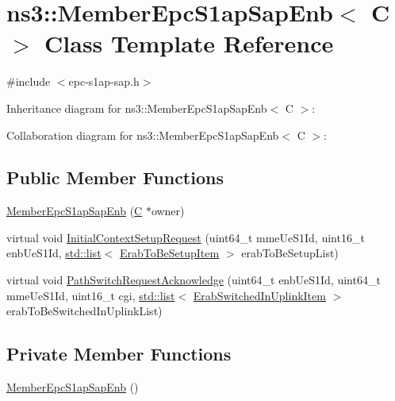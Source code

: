 \hypertarget{classns3_1_1MemberEpcS1apSapEnb}{}\section{ns3\+:\+:Member\+Epc\+S1ap\+Sap\+Enb$<$ C $>$ Class Template Reference}
\label{classns3_1_1MemberEpcS1apSapEnb}


{\ttfamily \#include $<$epc-\/s1ap-\/sap.\+h$>$}



Inheritance diagram for ns3\+:\+:Member\+Epc\+S1ap\+Sap\+Enb$<$ C $>$\+:


Collaboration diagram for ns3\+:\+:Member\+Epc\+S1ap\+Sap\+Enb$<$ C $>$\+:
\subsection*{Public Member Functions}
\begin{DoxyCompactItemize}
\item 
\hyperlink{classns3_1_1MemberEpcS1apSapEnb_a7f5569d5292005d77c8face5c3845870}{Member\+Epc\+S1ap\+Sap\+Enb} (\hyperlink{loss__COST231__small__cities__urban_8m_aaa53ca0b650dfd85c4f59fa156f7a2cc}{C} $\ast$owner)
\item 
virtual void \hyperlink{classns3_1_1MemberEpcS1apSapEnb_ab39eeb645ba5a22dc32e11c46fc8b9cb}{Initial\+Context\+Setup\+Request} (uint64\+\_\+t mme\+Ue\+S1\+Id, uint16\+\_\+t enb\+Ue\+S1\+Id, \hyperlink{openflow-interface_8h_afd9bcfa176617760671b67580f536fa7}{std\+::list}$<$ \hyperlink{structns3_1_1EpcS1apSap_1_1ErabToBeSetupItem}{Erab\+To\+Be\+Setup\+Item} $>$ erab\+To\+Be\+Setup\+List)
\item 
virtual void \hyperlink{classns3_1_1MemberEpcS1apSapEnb_a6b8d93cd02915eca6ace7337efb10c28}{Path\+Switch\+Request\+Acknowledge} (uint64\+\_\+t enb\+Ue\+S1\+Id, uint64\+\_\+t mme\+Ue\+S1\+Id, uint16\+\_\+t cgi, \hyperlink{openflow-interface_8h_afd9bcfa176617760671b67580f536fa7}{std\+::list}$<$ \hyperlink{structns3_1_1EpcS1apSap_1_1ErabSwitchedInUplinkItem}{Erab\+Switched\+In\+Uplink\+Item} $>$ erab\+To\+Be\+Switched\+In\+Uplink\+List)
\end{DoxyCompactItemize}
\subsection*{Private Member Functions}
\begin{DoxyCompactItemize}
\item 
\hyperlink{classns3_1_1MemberEpcS1apSapEnb_a1eb5a648fa11b3ca422264ca1ec71fa0}{Member\+Epc\+S1ap\+Sap\+Enb} ()
\end{DoxyCompactItemize}
